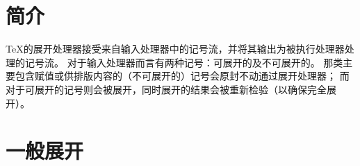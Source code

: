 \documentclass{book}
\begin{document}
\section{简介}

{\TeX}的展开处理器接受来自输入处理器中的记号流，并将其输出为被执行处理器处理的记号流。
对于输入处理器而言有两种记号：可展开的及不可展开的。
那类主要包含赋值或供排版内容的（不可展开的）记号会原封不动通过展开处理器；
而对于可展开的记号则会被展开，同时展开的结果会被重新检验（以确保完全展开）。

\section{一般展开}
\end{document}
